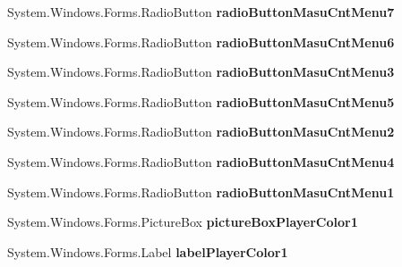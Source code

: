 \begin{DoxyCompactItemize}
System.\+Windows.\+Forms.\+Radio\+Button {\bfseries radio\+Button\+Masu\+Cnt\+Menu7}
\item 
\mbox{\label{class_reversi_form_1_1_setting_form_a239370e64338ff15d84c7a7c8a552c7d}} 
System.\+Windows.\+Forms.\+Radio\+Button {\bfseries radio\+Button\+Masu\+Cnt\+Menu6}
\item 
\mbox{\label{class_reversi_form_1_1_setting_form_a052cef23abfd0ddd55df7d01a4b30d37}} 
System.\+Windows.\+Forms.\+Radio\+Button {\bfseries radio\+Button\+Masu\+Cnt\+Menu3}
\item 
\mbox{\label{class_reversi_form_1_1_setting_form_a761e3927dedd9165dc0df34cb190a17e}} 
System.\+Windows.\+Forms.\+Radio\+Button {\bfseries radio\+Button\+Masu\+Cnt\+Menu5}
\item 
\mbox{\label{class_reversi_form_1_1_setting_form_ab6d8a40c317f22bfc0fa0a624b1179d0}} 
System.\+Windows.\+Forms.\+Radio\+Button {\bfseries radio\+Button\+Masu\+Cnt\+Menu2}
\item 
\mbox{\label{class_reversi_form_1_1_setting_form_aa287be0963d4ad81d90fb7343fe94254}} 
System.\+Windows.\+Forms.\+Radio\+Button {\bfseries radio\+Button\+Masu\+Cnt\+Menu4}
\item 
\mbox{\label{class_reversi_form_1_1_setting_form_ae8521c0ea281853abfc5d95ce2c7739e}} 
System.\+Windows.\+Forms.\+Radio\+Button {\bfseries radio\+Button\+Masu\+Cnt\+Menu1}
\item 
\mbox{\label{class_reversi_form_1_1_setting_form_a5b1fad61de889071e9fff91eb00679af}} 
System.\+Windows.\+Forms.\+Picture\+Box {\bfseries picture\+Box\+Player\+Color1}
\item 
\mbox{\label{class_reversi_form_1_1_setting_form_aa01628cb353dcab2d3a7f72198dca235}} 
System.\+Windows.\+Forms.\+Label {\bfseries label\+Player\+Color1}
\item 
\mbox{\label{class_reversi_form_1_1_setting_form_abed995729356430ae8b13742b9f67fef}} 

\end{DoxyCompactItemize}

